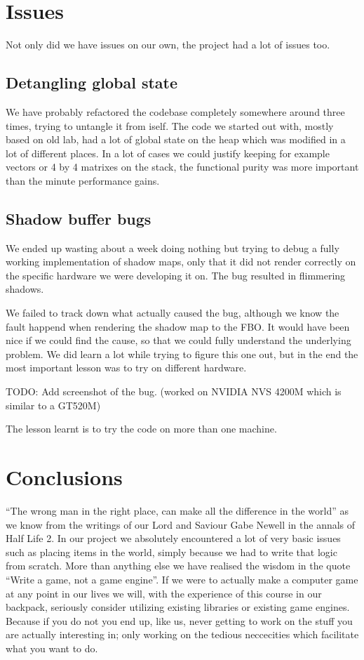 \documentclass[a4paper,12pt]{article}
\begin{document}
\section{Issues}

Not only did we have issues on our own, the project had a lot of issues too.

\subsection{Detangling global state}

We have probably refactored the codebase completely somewhere around three times, trying to untangle it from iself. The code we started out with, mostly based on old lab, had a lot of global state on the heap which was modified in a lot of different places. In a lot of cases we could justify keeping for example vectors or 4 by 4 matrixes on the stack, the functional purity was more important than the minute performance gains.

\subsection{Shadow buffer bugs}

We ended up wasting about a week doing nothing but trying to debug a fully working implementation of shadow maps, only that it did not render correctly on the specific hardware we were developing it on. The bug resulted in flimmering shadows.

We failed to track down what actually caused the bug, although we know the fault happend when rendering the shadow map to the FBO. It would have been nice if we could find the cause, so that we could fully understand the underlying problem. We did learn a lot while trying to figure this one out, but in the end the most important lesson was to try on different hardware.

TODO: Add screenshot of the bug. (worked on NVIDIA NVS 4200M which is similar to a GT520M)

The lesson learnt is to try the code on more than one machine.



\section{Conclusions}

``The wrong man in the right place, can make all the difference in the world'' as we know from the writings of our Lord and Saviour Gabe Newell in the annals of Half Life 2. In our project we absolutely encountered a lot of very basic issues such as placing items in the world, simply because we had to write that logic from scratch. More than anything else we have realised the wisdom in the quote ``Write a game, not a game engine''. If we were to actually make a computer game at any point in our lives we will, with the experience of this course in our backpack, seriously consider utilizing existing libraries or existing game engines. Because if you do not you end up, like us, never getting to work on the stuff you are actually interesting in; only working on the tedious neccecities which facilitate what you want to do.
\end{document}
